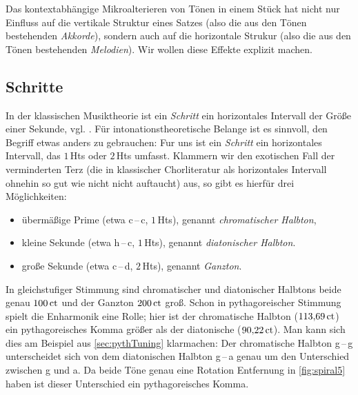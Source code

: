Das kontextabhängige Mikroalterieren von Tönen in einem Stück hat nicht nur
Einfluss auf die vertikale Struktur eines Satzes (also die aus den Tönen
bestehenden \emph{Akkorde}), sondern auch auf die horizontale Strukur (also die
aus den Tönen bestehenden \emph{Melodien}). Wir wollen diese Effekte explizit
machen.

\subsection{Schritte}
\label{sec:steps}

In der klassischen Musiktheorie ist ein \emph{Schritt} ein horizontales
Intervall der Größe einer Sekunde, vgl. \cite[{}7.1]{Skript}.  Für
intonationstheoretische Belange ist es sinnvoll, den Begriff etwas anders zu
gebrauchen: Fur uns ist ein \emph{Schritt} ein horizontales Intervall, das
$1$\,Hts oder $2$\,Hts umfasst. Klammern wir den exotischen Fall der
verminderten Terz (die in klassischer Chorliteratur als horizontales Intervall
ohnehin so gut wie nicht nicht auftaucht) aus, so gibt es hierfür drei
Möglichkeiten:
\begin{itemize}[itemsep=0em]
\item übermäßige Prime (etwa c\,–\,\sharp c, $1$\,Hts), genannt
  \emph{chromatischer Halbton},
\item kleine Sekunde (etwa h\,–\,c, $1$\,Hts), genannt
  \emph{diatonischer Halbton}.
\item große Sekunde (etwa c\,–\,d, $2$\,Hts), genannt
  \emph{Ganzton}.
\end{itemize}
In gleichstufiger Stimmung sind chromatischer und diatonischer Halbtons beide
genau $100\,\text{ct}$ und der Ganzton $200\,\text{ct}$ groß.  Schon in pythagoreischer Stimmung
spielt die Enharmonik eine Rolle; hier ist der chromatische Halbton
($113{,}69\,\text{ct}$) ein pythagoreisches Komma größer als der diatonische
($90{,}22\,\text{ct}$). Man kann sich dies am Beispiel aus \cref{sec:pythTuning}
klarmachen: Der chromatische Halbton g\,–\,\sharp g unterscheidet sich von dem
diatonischen Halbton g\,–\,\flat a genau um den Unterschied zwischen \sharp g
und \flat a. Da beide Töne genau eine Rotation Entfernung in \cref{fig:spiral5}
haben ist dieser Unterschied ein pythagoreisches Komma.

